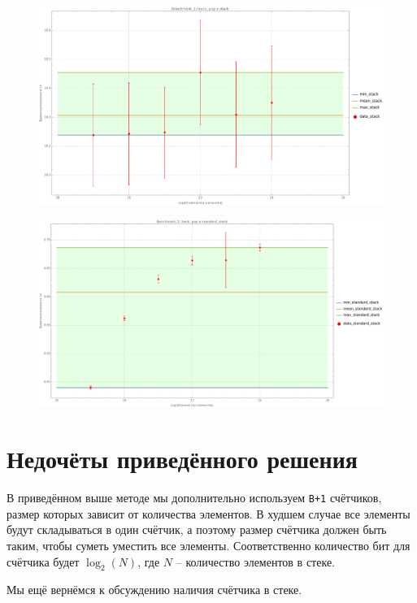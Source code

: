 \begin{figure}[H]
  \centering
  \includegraphics[width=1.0\textwidth]{../../resources/benchmark_3_4.png}
  \caption{}
\end{figure}
\begin{figure}[H]
  \centering
  \includegraphics[width=1.0\textwidth]{../../resources/benchmark_3_5.png}
  \caption{}
\end{figure}

\section{Недочёты приведённого решения}

В приведённом выше методе мы дополнительно используем \texttt{B+1} счётчиков, размер которых зависит от количества элементов. В худшем случае все элементы будут складываться в один счётчик, а поэтому размер счётчика должен быть таким, чтобы суметь уместить все элементы. Соответственно количество бит для счётчика будет \(\log_2(N)\), где \(N\) -- количество элементов в стеке.
\begin{mdframed}[style=mdfStyleCode]%
    \begin{remark}\rm%
    Мы ещё вернёмся к обсуждению наличия счётчика в стеке.
\end{remark}
\end{mdframed}

